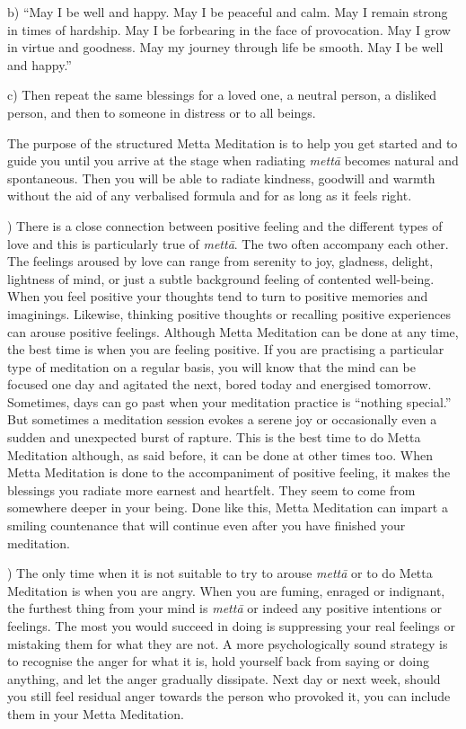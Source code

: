 \documentclass[10pt, openright]{book}
\begin{document}
b) “May I be well and happy. May I be peaceful and calm. May I remain strong in times of hardship. May I be forbearing in the face of provocation. May I grow in virtue and goodness. May my journey through life be smooth. May I be well and happy.”


c) Then repeat the same blessings for a loved one, a neutral person, a disliked person, and then to someone in distress or to all beings.


The purpose of the structured Metta Meditation is to help you get started and to guide you until you arrive at the stage when radiating \textit{mettā} becomes natural and spontaneous. Then you will be able to radiate kindness, goodwill and warmth without the aid of any verbalised formula and for as long as it feels right.


\vspace* {1em}) There is a close connection between positive feeling and the different types of love and this is particularly true of \textit{mettā}. The two often accompany each other. The feelings aroused by love can range from serenity to joy, gladness, delight, lightness of mind, or just a subtle background feeling of contented well-being. When you feel positive your thoughts tend to turn to positive memories and imaginings. Likewise, thinking positive thoughts or recalling positive experiences can arouse positive feelings. Although Metta Meditation can be done at any time, the best time is when you are feeling positive. If you are practising a particular type of meditation on a regular basis, you will know that the mind can be focused one day and agitated the next, bored today and energised tomorrow. Sometimes, days can go past when your meditation practice is “nothing special.” But sometimes a meditation session evokes a serene joy or occasionally even a sudden and unexpected burst of rapture. This is the best time to do Metta Meditation although, as said before, it can be done at other times too. When Metta Meditation is done to the accompaniment of positive feeling, it makes the blessings you radiate more earnest and heartfelt. They seem to come from somewhere deeper in your being. Done like this, Metta Meditation can impart a smiling countenance that will continue even after you have finished your meditation.


\vspace* {1em}) The only time when it is not suitable to try to arouse \textit{mettā} or to do Metta Meditation is when you are angry. When you are fuming, enraged or indignant, the furthest thing from your mind is \textit{mettā} or indeed any positive intentions or feelings. The most you would succeed in doing is suppressing your real feelings or mistaking them for what they are not. A more psychologically sound strategy is to recognise the anger for what it is, hold yourself back from saying or doing anything, and let the anger gradually dissipate. Next day or next week, should you still feel residual anger towards the person who provoked it, you can include them in your Metta Meditation.
\end{document}
